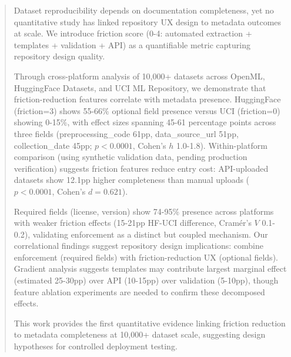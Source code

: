\begin{abstract}
Dataset reproducibility depends on documentation completeness, yet no quantitative study has linked repository UX design to metadata outcomes at scale. We introduce friction score (0-4: automated extraction + templates + validation + API) as a quantifiable metric capturing repository design quality.

Through cross-platform analysis of 10,000+ datasets across OpenML, HuggingFace Datasets, and UCI ML Repository, we demonstrate that friction-reduction features correlate with metadata presence. HuggingFace (friction=3) shows 55-66\% optional field presence versus UCI (friction=0) showing 0-15\%, with effect sizes spanning 45-61 percentage points across three fields (preprocessing\_code 61pp, data\_source\_url 51pp, collection\_date 45pp; $p<0.0001$, Cohen's $h$ 1.0-1.8). Within-platform comparison (using synthetic validation data, pending production verification) suggests friction features reduce entry cost: API-uploaded datasets show 12.1pp higher completeness than manual uploads ($p<0.0001$, Cohen's $d=0.621$).

Required fields (license, version) show 74-95\% presence across platforms with weaker friction effects (15-21pp HF-UCI difference, Cramér's $V$ 0.1-0.2), validating enforcement as a distinct but coupled mechanism. Our correlational findings suggest repository design implications: combine enforcement (required fields) with friction-reduction UX (optional fields). Gradient analysis suggests templates may contribute largest marginal effect (estimated 25-30pp) over API (10-15pp) over validation (5-10pp), though feature ablation experiments are needed to confirm these decomposed effects.

This work provides the first quantitative evidence linking friction reduction to metadata completeness at 10,000+ dataset scale, suggesting design hypotheses for controlled deployment testing.
\end{abstract}
